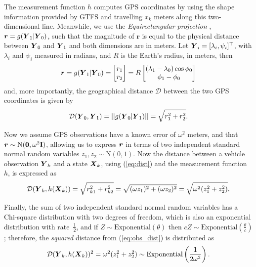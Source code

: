 The measurement function $h$ computes GPS coordinates by using the 
shape information provided by GTFS and travelling $x_k$ meters along 
this two-dimensional line.
Meanwhile, we use the \emph{Equirectangular projection} \citep{Snyder_1998},
$\boldsymbol{r} = g(\mbox{$\boldsymbol{Y}$}_1 | \mbox{$\boldsymbol{Y}$}_0)$,
such that the magnitude of $\boldsymbol{r}$ is equal to the physical distance
between $\mbox{$\boldsymbol{Y}$}_0$ and $\mbox{$\boldsymbol{Y}$}_1$ and both dimensions are in meters.
Let $\mbox{$\boldsymbol{Y}$}_i = [\lambda_i, \psi_i]^\top$,
with $\lambda_i$ and $\psi_i$ measured in radians,  
and $R$ is the Earth's radius, in meters, then
\begin{equation*}
\boldsymbol{r} = 
g(\mbox{$\boldsymbol{Y}$}_1 | \mbox{$\boldsymbol{Y}$}_0) = 
    \begin{bmatrix}
        r_1 \\ r_2
    \end{bmatrix} =
    R \begin{bmatrix}
        (\lambda_1 - \lambda_0)\cos\phi_0 \\
        \phi_1 - \phi_0
    \end{bmatrix}
\end{equation*}
and, more importantly, the geographical distance $\mathcal{D}$ between the two 
GPS coordinates is given by
\begin{equation}
\label{eq:dist}
\mathcal{D}(\mbox{$\boldsymbol{Y}$}_0, \mbox{$\boldsymbol{Y}$}_1) = ||g(\mbox{$\boldsymbol{Y}$}_0 | \mbox{$\boldsymbol{Y}$}_1)|| = \sqrt{r_1^2 + r_2^2}.
\end{equation}


Now we assume GPS observations have a known error of $\omega^2$ meters,
and that \mbox{$\boldsymbol{r} \sim \mathrm{N}(\boldsymbol{0}, \omega^2\mathbf{I})$},
allowing us to express $\boldsymbol{r}$ in terms of two independent
standard normal random variables $z_1, z_2 \sim \mathrm{N}(0,1)$.
Now the distance between a vehicle observation $\mbox{$\boldsymbol{Y}$}_k$
and a state $\mbox{$\boldsymbol{X}$}_k$, using (\ref{eq:dist}) and the measurement function $h$,
is expressed as
\begin{equation}
\label{eq:obs_dist}
\mathcal{D}(\mbox{$\boldsymbol{Y}$}_k, h(\mbox{$\boldsymbol{X}$}_k)) = \sqrt{r_{k1}^2 + r_{k2}^2} 
    = \sqrt{(\omega z_1)^2 + (\omega z_2)^2}
    = \sqrt{\omega^2 (z_1^2 + z_2^2)}.
\end{equation}

Finally, the sum of two independent 
standard normal random variables has a Chi-square distribution with two degrees of freedom,
which is also an exponential distribution with rate~$\frac{1}{2}$,
and if $Z \sim \mathrm{Exponential}(\theta)$ then
$cZ \sim \mathrm{Exponential}(\frac{\theta}{c})$;
therefore, the \emph{squared} distance from (\ref{eq:obs_dist}) is distributed as
\begin{equation}
\label{eq:obs_exp}
\mathcal{D}(\mbox{$\boldsymbol{Y}$}_k, h(\mbox{$\boldsymbol{X}$}_k))^2 =
\omega^2(z_1^2 + z_2^2) \sim \mathrm{Exponential}\left(\frac{1}{2\omega^2}\right).
\end{equation}

